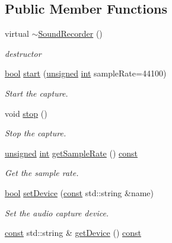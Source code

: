 \subsection*{Public Member Functions}
\begin{DoxyCompactItemize}
\item 
virtual \hyperlink{classsf_1_1_sound_recorder_acc599e61aaa47edaae88cf43f0a43549}{$\sim$\-Sound\-Recorder} ()
\begin{DoxyCompactList}\small\item\em destructor \end{DoxyCompactList}\item 
\hyperlink{term__entry_8h_a002004ba5d663f149f6c38064926abac}{bool} \hyperlink{classsf_1_1_sound_recorder_a715f0fd2f228c83d79aaedca562ae51f}{start} (\hyperlink{curses_8priv_8h_aca40206900cfc164654362fa8d4ad1e6}{unsigned} \hyperlink{term__entry_8h_ad65b480f8c8270356b45a9890f6499ae}{int} sample\-Rate=44100)
\begin{DoxyCompactList}\small\item\em Start the capture. \end{DoxyCompactList}\item 
void \hyperlink{classsf_1_1_sound_recorder_a8d9c8346aa9aa409cfed4a1101159c4c}{stop} ()
\begin{DoxyCompactList}\small\item\em Stop the capture. \end{DoxyCompactList}\item 
\hyperlink{curses_8priv_8h_aca40206900cfc164654362fa8d4ad1e6}{unsigned} \hyperlink{term__entry_8h_ad65b480f8c8270356b45a9890f6499ae}{int} \hyperlink{classsf_1_1_sound_recorder_a1f3726cbe0a2b2b291b36beea57960d7}{get\-Sample\-Rate} () \hyperlink{term__entry_8h_a57bd63ce7f9a353488880e3de6692d5a}{const} 
\begin{DoxyCompactList}\small\item\em Get the sample rate. \end{DoxyCompactList}\item 
\hyperlink{term__entry_8h_a002004ba5d663f149f6c38064926abac}{bool} \hyperlink{classsf_1_1_sound_recorder_a8eb3e473292c16e874322815836d3cd3}{set\-Device} (\hyperlink{term__entry_8h_a57bd63ce7f9a353488880e3de6692d5a}{const} std\-::string \&name)
\begin{DoxyCompactList}\small\item\em Set the audio capture device. \end{DoxyCompactList}\item 
\hyperlink{term__entry_8h_a57bd63ce7f9a353488880e3de6692d5a}{const} std\-::string \& \hyperlink{classsf_1_1_sound_recorder_a911218297b0fb5c050b3e34e6ba1d38e}{get\-Device} () \hyperlink{term__entry_8h_a57bd63ce7f9a353488880e3de6692d5a}{const} 

\end{DoxyCompactItemize}
